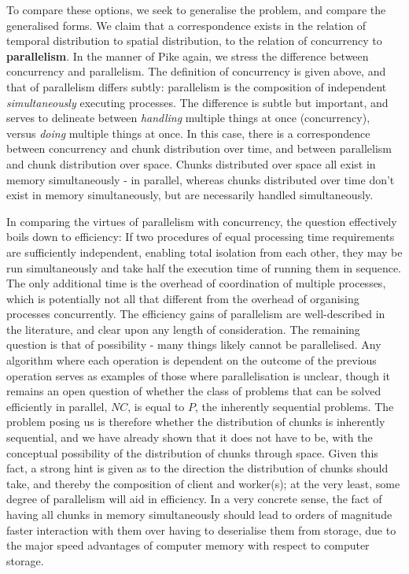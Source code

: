 To compare these options, we seek to generalise the problem, and compare the generalised forms.
We claim that a correspondence exists in the relation of temporal distribution to spatial distribution, to the relation of concurrency to \textbf{parallelism}.
In the manner of Pike again, we stress the difference between concurrency and parallelism.
The definition of concurrency is given above, and that of parallelism differs subtly: parallelism is the composition of independent \emph{simultaneously} executing processes.
The difference is subtle but important, and serves to delineate between \emph{handling} multiple things at once (concurrency), versus \emph{doing} multiple things at once.
In this case, there is a correspondence between concurrency and chunk distribution over time, and between parallelism and chunk distribution over space.
Chunks distributed over space all exist in memory simultaneously - in parallel, whereas chunks distributed over time don't exist in memory simultaneously, but are necessarily handled simultaneously.

In comparing the virtues of parallelism with concurrency, the question effectively boils down to efficiency: If two procedures of equal processing time requirements are sufficiently independent, enabling total isolation from each other, they may be run simultaneously and take half the execution time of running them in sequence.
The only additional time is the overhead of coordination of multiple processes, which is potentially not all that different from the overhead of organising processes concurrently.
The efficiency gains of parallelism are well-described in the literature, and clear upon any length of consideration.
The remaining question is that of possibility - many things likely cannot be parallelised.
Any algorithm where each operation is dependent on the outcome of the previous operation serves as examples of those where parallelisation is unclear, though it remains an open question of whether the class of problems that can be solved efficiently in parallel, \(NC\), is equal to \(P\), the inherently sequential problems.
The problem posing us is therefore whether the distribution of chunks is inherently sequential, and we have already shown that it does not have to be, with the conceptual possibility of the distribution of chunks through space.
Given this fact, a strong hint is given as to the direction the distribution of chunks should take, and thereby the composition of client and worker(s); at the very least, some degree of parallelism will aid in efficiency.
In a very concrete sense, the fact of having all chunks in memory simultaneously should lead to orders of magnitude faster interaction with them over having to deserialise them from storage, due to the major speed advantages of computer memory with respect to computer storage.

